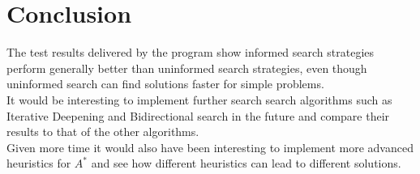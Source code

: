 \documentclass[journal]{IEEEtran}
\begin{document}
\section{Conclusion}
The test results delivered by the program show informed search strategies perform generally better than uninformed search strategies, even though uninformed search can find solutions faster for simple problems. \\
It would be interesting to implement further search search algorithms such as Iterative Deepening and Bidirectional search in the future and compare their results to that of the other algorithms. \\
Given more time it would also have been interesting to implement more advanced heuristics for $A^*$ and see how different heuristics can lead to different solutions.




%
\newpage







%
\end{document}
